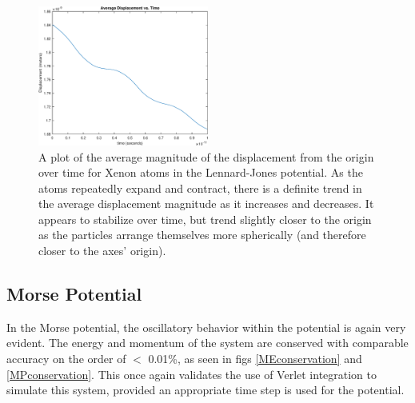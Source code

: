\documentclass[12pt]{article}
\begin{document}
\begin{figure}
\begin{center}
\includegraphics[width=0.5\textwidth]{./finalpics/LJaverager.eps}
\caption{\label{LJaverager} A plot of the average magnitude of the displacement from the origin over time for Xenon atoms in the Lennard-Jones potential.  As the atoms repeatedly expand and contract, there is a definite trend in the average displacement magnitude as it increases and decreases.  It appears to stabilize over time, but trend slightly closer to the origin as the particles arrange themselves more spherically (and therefore closer to the axes' origin).}
\end{center}
\end{figure}

\subsection*{Morse Potential}
In the Morse potential, the oscillatory behavior within the potential is again very evident.  The energy and momentum of the system are conserved with comparable accuracy on the order of $<$ 0.01\%, as seen in figs \ref{MEconservation} and \ref{MPconservation}.  This once again validates the use of Verlet integration to simulate this system, provided an appropriate time step is used for the potential.
\end{document}
